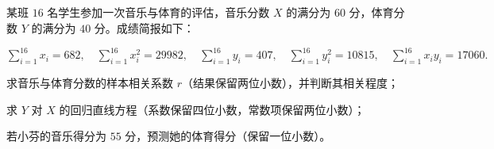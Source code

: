 \documentclass[12pt,a4paper]{exam-zh}
\begin{document}
\begin{question}
    某班 $16$ 名学生参加一次音乐与体育的评估，音乐分数 $X$ 的满分为 $60$ 分，体育分数 $Y$ 的满分为 $40$ 分。成绩简报如下：
    
      $  \sum\limits_{i=1}^{16}x_i=682,\quad \sum\limits_{i=1}^{16}x_i^2=29982,\quad
        \sum\limits_{i=1}^{16}y_i=407,\quad \sum\limits_{i=1}^{16}y_i^2=10815,\quad
        \sum\limits_{i=1}^{16}x_iy_i=17060.$
    

    \begin{questionparts}
        \item 求音乐与体育分数的样本相关系数 $r$（结果保留两位小数），并判断其相关程度；

        \item 求 $Y$ 对 $X$ 的回归直线方程（系数保留四位小数，常数项保留两位小数）；

        \item 若小芬的音乐得分为 $55$ 分，预测她的体育得分（保留一位小数）。
    \end{questionparts}
\end{question}
\end{document}

